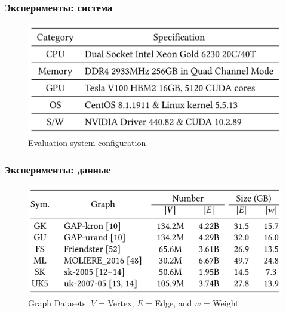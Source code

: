 \documentclass[xcolor=table,english]{beamer}
\begin{document}
\begin{frame}[fragile] \frametitle{Эксперименты: система}
    \begin{center}
    \begin{minipage}[m]{0.95\linewidth}
        \begin{figure}
            \centering
            \includegraphics[width=\textwidth]{figures/system_setup.png}
            \caption{Evaluation system configuration}
        \end{figure}
    \end{minipage}\hfill
    \end{center} 
\end{frame}

\begin{frame}[fragile] \frametitle{Эксперименты: данные}
    \begin{center}
    \begin{minipage}[m]{0.95\linewidth}
        \begin{figure}
            \centering
            \includegraphics[width=\textwidth]{figures/datasets.png}
            \caption{Graph Datasets. $V$ = Vertex, $E$ = Edge, and $w$ = Weight}
        \end{figure}
    \end{minipage}\hfill
    \end{center} 
\end{frame}
\end{document}
